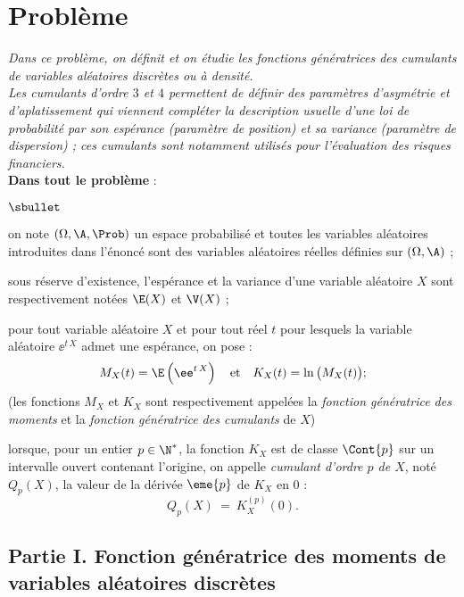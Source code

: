 \documentclass[11pt]{article}%
\begin{document}
\section*{Problème}

\noindent %
{\it Dans ce problème, on définit et on étudie les fonctions
  génératrices des cumulants de variables aléatoires discrètes ou à
  densité.\\
  Les cumulants d'ordre $3$ et $4$ permettent de définir des
  paramètres d'asymétrie et d'aplatissement qui viennent compléter la
  description usuelle d'une loi de probabilité par son espérance
  (paramètre de position) et sa variance (paramètre de dispersion) ;
  ces cumulants sont notamment utilisés pour l'évaluation des risques
  financiers.}\\[.2cm]
{\bf Dans tout le problème} :
\begin{noliste}{$\sbullet$}
\item on note $(\Omega, \A, \Prob)$ un espace probabilisé et toutes
  les variables aléatoires introduites dans l'énoncé sont des
  variables aléatoires réelles définies sur $(\Omega, \A)$ ;
  
\item sous réserve d'existence, l'espérance et la variance d'une
  variable aléatoire $X$ sont respectivement notées $\E(X)$ et $\V(X)$
  ;
  
\item pour tout variable aléatoire $X$ et pour tout réel $t$ pour
  lesquels la variable aléatoire $\ee^{t \, X}$ admet une espérance,
  on pose :
  \[
    M_X(t) = \E\left(\ee^{t \, X}\right) \quad \text{et} \quad K_X(t)
    = \ln\big(M_X(t)\big) ;
  \]
  (les fonctions $M_X$ et $K_X$ sont respectivement appelées la {\it
    fonction génératrice des moments} et la {\it fonction génératrice
    des cumulants} de $X$)
  
\item lorsque, pour un entier $p \in \N^*$, la fonction $K_X$ est de
  classe $\Cont{p}$ sur un intervalle ouvert contenant l'origine, on
  appelle {\it cumulant d'ordre $p$ de $X$}, noté $Q_p(X)$, la valeur
  de la dérivée $\eme{p}$ de $K_X$ en $0$ :
  \[
    Q_p(X) \ = \ K_X^{(p)}(0).
  \]
\end{noliste}


\subsection*{Partie I. Fonction génératrice des moments de variables
  aléatoires discrètes}
\end{document}
